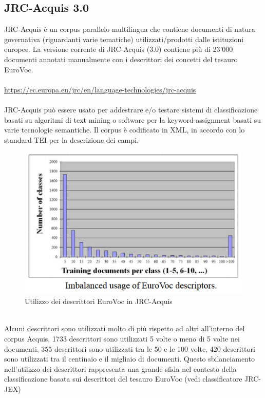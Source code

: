 \documentclass{article}
\theoremstyle{plain}
\theoremstyle{definition}
\begin{document}
\subsection{JRC-Acquis 3.0}
JRC-Acquis è un corpus parallelo multilingua che contiene documenti di natura governativa (riguardanti varie tematiche) utilizzati/prodotti dalle istituzioni europee.  
La versione corrente di JRC-Acquis (3.0) contiene più di 23'000 documenti annotati manualmente con i descrittori dei concetti del tesauro EuroVoc. 
\\
\\
\url{https://ec.europa.eu/jrc/en/language-technologies/jrc-acquis}
\\
\\
JRC-Acquis può essere usato per addestrare e/o testare sistemi di classificazione basati su algoritmi di text mining o software per la keyword-assignment basati su varie tecnologie semantiche. Il corpus è codificato in XML, in accordo con lo standard TEI per la descrizione dei campi.
\footnotemark
{}
\begin{figure}[htbp]
\begin{center}
\includegraphics[scale=1.00]{img/evocimbalanced.png}
\caption{Utilizzo dei descrittori EuroVoc in JRC-Acquis}
\end{center}
\end{figure}
\phantom
\\
Alcuni descrittori sono utilizzati molto di più rispetto ad altri all'interno del corpus Acquis, 1733 descrittori sono utilizzati 5 volte o meno di 5 volte nei documenti, 355 descrittori sono utilizzati tra le 50 e le 100 volte, 420 descrittori sono utilizzati tra il centinaio e il migliaio di documenti. Questo sbilanciamento nell'utilizzo dei descrittori rappresenta una grande sfida nel contesto della classificazione basata sui descrittori del tesauro EuroVoc (vedi classificatore JRC-JEX)
\end{document}
